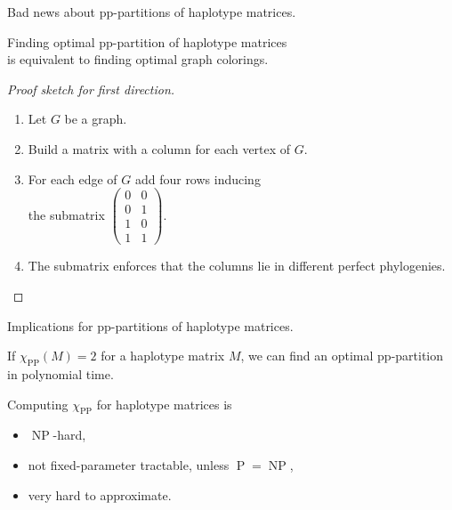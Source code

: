 \documentclass[aspectratio=1610]{beamer}
\begin{document}
\begin{frame}{Bad news about pp-partitions of haplotype matrices.}
  \begin{theorem}
    Finding \alert{optimal pp-partition of haplotype matrices}\\
    is equivalent to finding \alert{optimal graph colorings}.
  \end{theorem}

  \begin{proof}[Proof sketch for first direction]
    \begin{enumerate}
    \item Let $G$ be a graph.
    \item Build a matrix with a column for each vertex of $G$.
    \item For each edge of $G$ add four rows inducing\\the
      submatrix $\left(
        \begin{smallmatrix}
          0 & 0 \\
          0 & 1 \\
          1 & 0 \\
          1 & 1
        \end{smallmatrix}\right)$.
    \item The submatrix enforces that the columns lie in different
      perfect phylogenies. \qedhere  
    \end{enumerate}
  \end{proof}
\end{frame}

\begin{frame}{Implications for pp-partitions of haplotype matrices.}
  \begin{corollary}
    If $\chi_{\operatorname{PP}}(M) = 2$ for a haplotype matrix $M$,
    we can find an optimal pp-partition in polynomial time. 
  \end{corollary}

  \begin{corollary}
    Computing $\chi_{\operatorname{PP}}$ for haplotype matrices is
    \begin{itemize}
    \item $\operatorname{NP}$-hard,
    \item not fixed-parameter tractable, unless
      $\operatorname{P}=\operatorname{NP}$, 
    \item very hard to approximate.
    \end{itemize}
  \end{corollary}
\end{frame}
\end{document}
